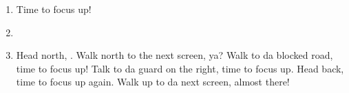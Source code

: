 \begin{enumerate}[resume]
\item Time to focus up!
\item \formation{\tidus}{\wakka}{\auron}
\item Head north, \save. Walk north to the next screen, ya? Walk to da blocked road, time to focus up! Talk to da guard on the right, time to focus up. Head back, time to focus up again. Walk up to da next screen, almost there!
\end{enumerate}